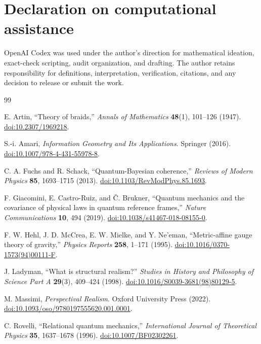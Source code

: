 \documentclass[11pt]{article}
\theoremstyle{definition}
\theoremstyle{remark}
\begin{document}
\section*{Declaration on computational assistance}

OpenAI Codex was used under the author's direction for mathematical ideation, exact-check scripting, audit organization, and drafting. The author retains responsibility for definitions, interpretation, verification, citations, and any decision to release or submit the work.

\begin{thebibliography}{99}
\raggedright
\small

E. Artin, ``Theory of braids,'' \emph{Annals of Mathematics} \textbf{48}(1), 101--126 (1947). \href{https://doi.org/10.2307/1969218}{doi:10.2307/1969218}.

S.-i. Amari, \emph{Information Geometry and Its Applications}. Springer (2016). \href{https://doi.org/10.1007/978-4-431-55978-8}{doi:10.1007/978-4-431-55978-8}.

C. A. Fuchs and R. Schack, ``Quantum-Bayesian coherence,'' \emph{Reviews of Modern Physics} \textbf{85}, 1693--1715 (2013). \href{https://doi.org/10.1103/RevModPhys.85.1693}{doi:10.1103/RevModPhys.85.1693}.

F. Giacomini, E. Castro-Ruiz, and \v{C}. Brukner, ``Quantum mechanics and the covariance of physical laws in quantum reference frames,'' \emph{Nature Communications} \textbf{10}, 494 (2019). \href{https://doi.org/10.1038/s41467-018-08155-0}{doi:10.1038/s41467-018-08155-0}.

F. W. Hehl, J. D. McCrea, E. W. Mielke, and Y. Ne'eman, ``Metric-affine gauge theory of gravity,'' \emph{Physics Reports} \textbf{258}, 1--171 (1995). \href{https://doi.org/10.1016/0370-1573(94)00111-F}{doi:10.1016/0370-1573(94)00111-F}.

J. Ladyman, ``What is structural realism?'' \emph{Studies in History and Philosophy of Science Part A} \textbf{29}(3), 409--424 (1998). \href{https://doi.org/10.1016/S0039-3681(98)80129-5}{doi:10.1016/S0039-3681(98)80129-5}.

M. Massimi, \emph{Perspectival Realism}. Oxford University Press (2022). \href{https://doi.org/10.1093/oso/9780197555620.001.0001}{doi:10.1093/oso/9780197555620.001.0001}.

C. Rovelli, ``Relational quantum mechanics,'' \emph{International Journal of Theoretical Physics} \textbf{35}, 1637--1678 (1996). \href{https://doi.org/10.1007/BF02302261}{doi:10.1007/BF02302261}.


\end{thebibliography}
\end{document}

